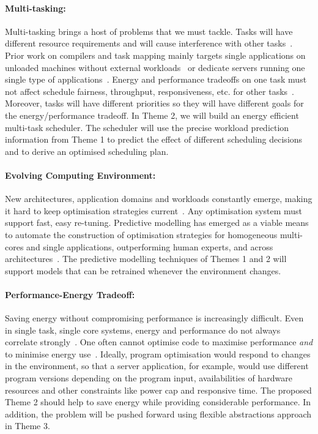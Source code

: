 \paragraph{Multi-tasking:} Multi-tasking brings a host of problems that we must
tackle. Tasks will have different resource requirements and will cause
interference with other tasks~\cite{zheng-cgo}. Prior work on compilers and
task mapping mainly targets single applications on unloaded machines without
external workloads~\cite{5375318,Raman:2012} or dedicate servers running one single
type of applications~\cite{Agarwal:2012:RDC:2228298.2228327}.
Energy and performance tradeoffs
on one task must not affect schedule fairness, throughput, responsiveness, etc.
for other tasks~\cite{lookbackandfor}. Moreover, tasks
will have different priorities so they will have different goals for the
energy/performance tradeoff. In Theme 2, we will build an energy efficient
multi-task scheduler. The scheduler will use the precise workload prediction
information from Theme 1 to predict the effect of different scheduling decisions
and to derive an optimised scheduling plan.

\paragraph{Evolving Computing Environment:} New architectures, application
domains and workloads constantly emerge, making it hard to keep optimisation
strategies current~\cite{5375327}. Any optimisation system must support fast,
easy re-tuning. Predictive modelling
has emerged as a viable means to automate the construction of optimisation
strategies for homogeneous multi-cores and single applications, outperforming
human experts, and across architectures~\cite{Stephenson:2003,Wang-pact}. The
predictive modelling techniques of Themes 1 and 2 will support models that can be
retrained whenever the environment changes.

\paragraph{Performance-Energy Tradeoff:} Saving energy without compromising
performance is increasingly difficult. Even in single task, single
core systems, energy and performance do not always correlate strongly~\cite{tradeoff}. 
One often cannot optimise code to maximise
performance \emph{and} to minimise energy
use~\cite{lookbackandfor}. Ideally, program optimisation would respond to changes in the environment, so that a server application, for example, would use different program versions depending on the program input, availabilities of hardware resources and other constraints like power cap and responsive time. The proposed Theme 2 should help to save energy while providing considerable performance. In addition, the problem will be pushed forward using flexible abstractions approach in Theme 3.
